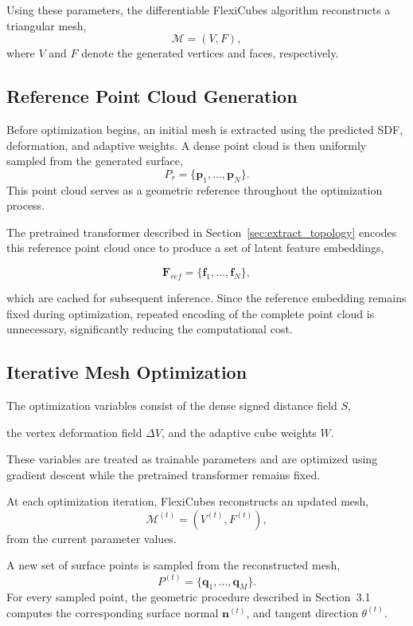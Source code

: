 \documentclass[../main.tex]{subfiles}
\begin{document}
Using these parameters, the differentiable FlexiCubes algorithm reconstructs a triangular mesh,
\[
\mathcal{M}
=
(V,F),
\]
where \(V\) and \(F\) denote the generated vertices and faces, respectively.

\subsection{Reference Point Cloud Generation}

Before optimization begins, an initial mesh is extracted using the predicted SDF, deformation, and adaptive weights. A dense point cloud is then uniformly sampled from the generated surface,
\[
P_r
=
\{\mathbf{p}_1,\ldots,\mathbf{p}_N\}.
\]
This point cloud serves as a geometric reference throughout the optimization process.

The pretrained transformer described in Section~\ref{sec:extract_topology} encodes this reference point cloud once to produce a set of latent feature embeddings,

\[
\mathbf{F}_{ref}
=
\{\mathbf{f}_1,\ldots,\mathbf{f}_N\},
\]

which are cached for subsequent inference. Since the reference embedding remains fixed during optimization, repeated encoding of the complete point cloud is unnecessary, significantly reducing the computational cost.

\subsection{Iterative Mesh Optimization}

The optimization variables consist of the dense signed distance field $S$,

the vertex deformation field $\Delta V$,
and the adaptive cube weights $W$.

These variables are treated as trainable parameters and are optimized using gradient descent while the pretrained transformer remains fixed.

At each optimization iteration, FlexiCubes reconstructs an updated mesh,
\[
\mathcal{M}^{(t)}
=
(V^{(t)},F^{(t)}),
\]
from the current parameter values.

A new set of surface points is sampled from the reconstructed mesh,
\[
P^{(t)}
=
\{\mathbf{q}_1,\ldots,\mathbf{q}_M\}.
\]
For every sampled point, the geometric procedure described in Section~3.1 computes the corresponding surface normal $\mathbf{n}^{(t)}$, and tangent direction $\theta^{(t)}$.
\end{document}
